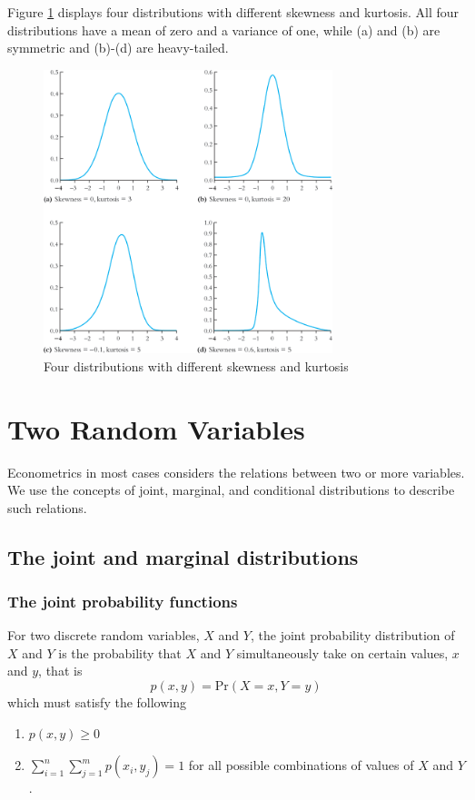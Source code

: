 \documentclass[a4paper,11pt]{article}
\begin{document}
\begin{itemize}
Figure \ref{fig:orga4c7fa3} displays four distributions with different
skewness and kurtosis. All four distributions have a mean of zero and
a variance of one, while (a) and (b) are symmetric and (b)-(d) are
heavy-tailed.

\begin{figure}[htbp]
\centering
\includegraphics[width=0.75\textwidth,height=0.5\textheight]{figure/fig-2-3.png}
\caption{\label{fig:orga4c7fa3}
Four distributions with different skewness and kurtosis}
\end{figure}
\end{itemize}


\section{Two Random Variables}
\label{sec:org142e96a}

Econometrics in most cases considers the relations between two or
more variables. We use the concepts of joint, marginal, and
conditional distributions to describe such relations.

\subsection{The joint and marginal distributions}
\label{sec:org00d1284}

\subsubsection*{The joint probability functions}
\label{sec:org3285557}

For two discrete random variables, \(X\) and \(Y\), the joint probability
distribution of \(X\) and \(Y\) is the probability that \(X\) and \(Y\)
simultaneously take on certain values, \(x\) and \(y\), that is
\[ p(x, y) = \mathrm{Pr}(X = x, Y = y)\]
which must satisfy the following
\begin{enumerate}
\item \(p(x, y) \geq 0\)
\item \(\sum_{i=1}^n\sum_{j=1}^m p(x_i, y_j) = 1\) for all possible
combinations of values of \(X\) and \(Y\).
\end{enumerate}
\end{document}

